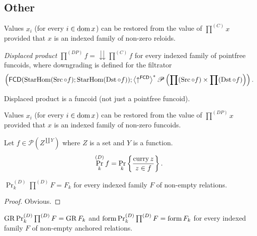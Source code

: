 \subsection{Other}
\begin{conjecture}
Values $x_{i}$ (for every $i\in\operatorname{dom} x$) can be restored from the
value of $\prod^{(C)}x$ provided that $x$ is an indexed family of
non-zero reloids.\end{conjecture}
\begin{defn}
\emph{Displaced product} $\prod^{(DP)}f=\downdownarrows\prod^{(C)}f$
for every indexed family of pointfree funcoids, where downgrading
is defined for the filtrator 
\[
\left(\mathsf{FCD}(\operatorname{StarHom}(\operatorname{Src}\circ f);\operatorname{StarHom}(\operatorname{Dst}\circ f));\left\langle \uparrow^{\mathsf{FCD}}\right\rangle ^{\ast}\mathscr{P}\left(\prod(\operatorname{Src}\circ f)\times\prod(\operatorname{Dst}\circ f)\right)\right).
\]
\end{defn}
\begin{rem}
Displaced product is a funcoid (not just a pointfree funcoid).\end{rem}
\begin{conjecture}
Values $x_{i}$ (for every $i\in\operatorname{dom} x$) can be restored from the
value of $\prod^{(DP)}x$ provided that $x$ is an indexed family
of non-zero funcoids.\end{conjecture}
\begin{defn}
Let $f\in\mathscr{P}\left(Z^{\coprod Y}\right)$ where $Z$ is a set
and $Y$ is a function. 
\[
\Pr_{k}^{(D)}f=\Pr_{k}\left\{ \frac{\operatorname{curry} z}{z\in f}\right\}.
\]
\end{defn}
\begin{prop}
$\Pr_{k}^{(D)}\prod^{(D)}F=F_{k}$ for every indexed family $F$ of
non-empty relations.\end{prop}
\begin{proof}
Obvious.\end{proof}
\begin{cor}
$\operatorname{GR}\Pr_{k}^{(D)}\prod^{(D)}F=\operatorname{GR} F_{k}$ and $\operatorname{form}\Pr_{k}^{(D)}\prod^{(D)}F=\operatorname{form} F_{k}$
for every indexed family $F$ of non-empty anchored relations.
\end{cor}

